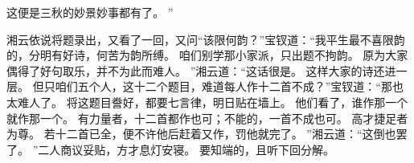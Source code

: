 这便是三秋的妙景妙事都有了。
”\par
湘云依说将题录出，又看了一回，又问“该限何韵？”宝钗道：“我平生最不喜限韵的，分明有好诗，何苦为韵所缚。
咱们别学那小家派，只出题不拘韵。
原为大家偶得了好句取乐，并不为此而难人。
”湘云道：“这话很是。
这样大家的诗还进一层。
但只咱们五个人，这十二个题目，难道每人作十二首不成？”宝钗道：“那也太难人了。
将这题目誊好，都要七言律，明日贴在墙上。
他们看了，谁作那一个就作那一个。
有力量者，十二首都作也可；不能的，一首不成也可。
高才捷足者为尊。
若十二首已全，便不许他后赶着又作，罚他就完了。
”湘云道：“这倒也罢了。
”二人商议妥贴，方才息灯安寝。
要知端的，且听下回分解。
\par
{}
